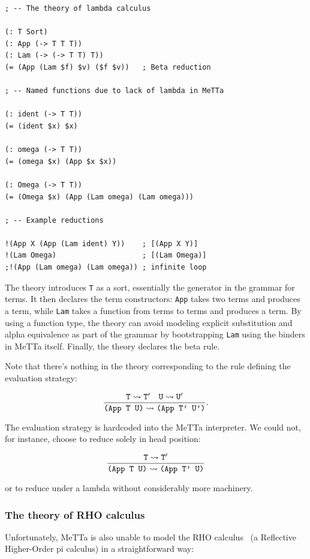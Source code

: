 \documentclass{article}
\begin{document}
\begin{verbatim}
; -- The theory of lambda calculus

(: T Sort)
(: App (-> T T T))
(: Lam (-> (-> T T) T))
(= (App (Lam $f) $v) ($f $v))   ; Beta reduction

; -- Named functions due to lack of lambda in MeTTa

(: ident (-> T T))
(= (ident $x) $x)

(: omega (-> T T))
(= (omega $x) (App $x $x))

(: Omega (-> T T))
(= (Omega $x) (App (Lam omega) (Lam omega)))

; -- Example reductions

!(App X (App (Lam ident) Y))    ; [(App X Y)]
!(Lam Omega)                    ; [(Lam Omega)]
;!(App (Lam omega) (Lam omega)) ; infinite loop
\end{verbatim}

The theory introduces \verb+T+ as a sort, essentially the generator in the grammar for terms.  It then declares the term constructors: \verb+App+ takes two terms and produces a term, while \verb+Lam+ takes a function from terms to terms and produces a term.  By using a function type, the theory can avoid modeling explicit substitution and alpha equivalence as part of the grammar by bootstrapping \verb+Lam+ using the binders in MeTTa itself.  Finally, the theory declares the beta rule.

Note that there's nothing in the theory corresponding to the rule defining the evaluation strategy:

\[ \frac{{\tt T} \leadsto {\tt T'} \quad {\tt U} \leadsto {\tt U'}}{\mbox{\tt (App T U)} \leadsto \mbox{\tt (App T' U')}}. \]

The evaluation strategy is hardcoded into the MeTTa interpreter.  We could not, for instance, choose to reduce solely in head position:

\[ \frac{{\tt T} \leadsto {\tt T'}}{\mbox{\tt (App T U)} \leadsto \mbox{\tt (App T' U)}} \]

or to reduce under a lambda without considerably more machinery.

\subsubsection{The theory of RHO calculus}

Unfortunately, MeTTa is also unable to model the RHO calculus~\cite{MeredithRadestock2005} (a Reflective Higher-Order pi calculus) in a straightforward way:
\end{document}
